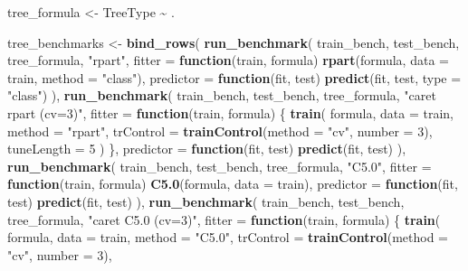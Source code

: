 \documentclass[
  11pt,
]{article}
\newenvironment{Shaded}{\begin{snugshade}}{\end{snugshade}}
\newcommand{\AttributeTok}[1]{\textcolor[rgb]{0.13,0.29,0.53}{#1}}
\newcommand{\ControlFlowTok}[1]{\textcolor[rgb]{0.13,0.29,0.53}{\textbf{#1}}}
\newcommand{\DecValTok}[1]{\textcolor[rgb]{0.00,0.00,0.81}{#1}}
\newcommand{\FunctionTok}[1]{\textcolor[rgb]{0.13,0.29,0.53}{\textbf{#1}}}
\newcommand{\NormalTok}[1]{#1}
\newcommand{\OtherTok}[1]{\textcolor[rgb]{0.56,0.35,0.01}{#1}}
\newcommand{\SpecialCharTok}[1]{\textcolor[rgb]{0.81,0.36,0.00}{\textbf{#1}}}
\newcommand{\StringTok}[1]{\textcolor[rgb]{0.31,0.60,0.02}{#1}}
\begin{document}
\begin{Shaded}
\begin{Highlighting}[]
\NormalTok{tree\_formula }\OtherTok{\textless{}{-}}\NormalTok{ TreeType }\SpecialCharTok{\textasciitilde{}}\NormalTok{ .}

\NormalTok{tree\_benchmarks }\OtherTok{\textless{}{-}} \FunctionTok{bind\_rows}\NormalTok{(}
  \FunctionTok{run\_benchmark}\NormalTok{(}
\NormalTok{    train\_bench, test\_bench, tree\_formula, }\StringTok{"rpart"}\NormalTok{,}
    \AttributeTok{fitter =} \ControlFlowTok{function}\NormalTok{(train, formula) }\FunctionTok{rpart}\NormalTok{(formula, }\AttributeTok{data =}\NormalTok{ train, }\AttributeTok{method =} \StringTok{"class"}\NormalTok{),}
    \AttributeTok{predictor =} \ControlFlowTok{function}\NormalTok{(fit, test) }\FunctionTok{predict}\NormalTok{(fit, test, }\AttributeTok{type =} \StringTok{"class"}\NormalTok{)}
\NormalTok{  ),}
  \FunctionTok{run\_benchmark}\NormalTok{(}
\NormalTok{    train\_bench, test\_bench, tree\_formula, }\StringTok{"caret rpart (cv=3)"}\NormalTok{,}
    \AttributeTok{fitter =} \ControlFlowTok{function}\NormalTok{(train, formula) \{}
      \FunctionTok{train}\NormalTok{(}
\NormalTok{        formula, }\AttributeTok{data =}\NormalTok{ train, }\AttributeTok{method =} \StringTok{"rpart"}\NormalTok{,}
        \AttributeTok{trControl =} \FunctionTok{trainControl}\NormalTok{(}\AttributeTok{method =} \StringTok{"cv"}\NormalTok{, }\AttributeTok{number =} \DecValTok{3}\NormalTok{),}
        \AttributeTok{tuneLength =} \DecValTok{5}
\NormalTok{      )}
\NormalTok{    \},}
    \AttributeTok{predictor =} \ControlFlowTok{function}\NormalTok{(fit, test) }\FunctionTok{predict}\NormalTok{(fit, test)}
\NormalTok{  ),}
  \FunctionTok{run\_benchmark}\NormalTok{(}
\NormalTok{    train\_bench, test\_bench, tree\_formula, }\StringTok{"C5.0"}\NormalTok{,}
    \AttributeTok{fitter =} \ControlFlowTok{function}\NormalTok{(train, formula) }\FunctionTok{C5.0}\NormalTok{(formula, }\AttributeTok{data =}\NormalTok{ train),}
    \AttributeTok{predictor =} \ControlFlowTok{function}\NormalTok{(fit, test) }\FunctionTok{predict}\NormalTok{(fit, test)}
\NormalTok{  ),}
  \FunctionTok{run\_benchmark}\NormalTok{(}
\NormalTok{    train\_bench, test\_bench, tree\_formula, }\StringTok{"caret C5.0 (cv=3)"}\NormalTok{,}
    \AttributeTok{fitter =} \ControlFlowTok{function}\NormalTok{(train, formula) \{}
      \FunctionTok{train}\NormalTok{(}
\NormalTok{        formula, }\AttributeTok{data =}\NormalTok{ train, }\AttributeTok{method =} \StringTok{"C5.0"}\NormalTok{,}
        \AttributeTok{trControl =} \FunctionTok{trainControl}\NormalTok{(}\AttributeTok{method =} \StringTok{"cv"}\NormalTok{, }\AttributeTok{number =} \DecValTok{3}\NormalTok{),}

\end{Highlighting}
\end{Shaded}
\end{document}
